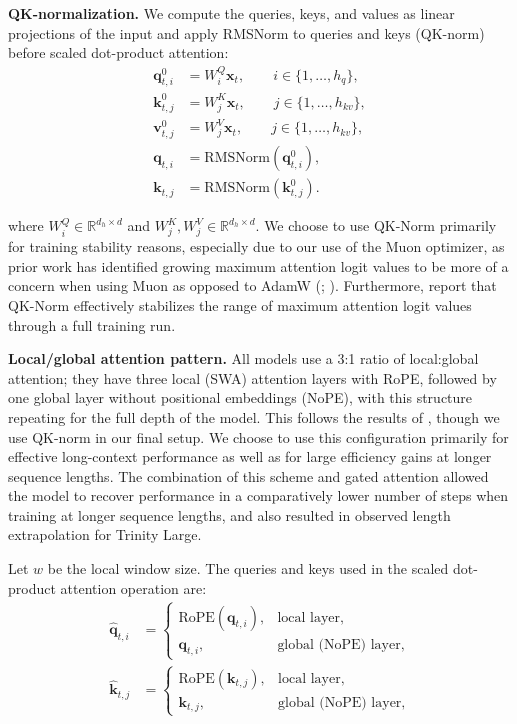 \documentclass{article}
\begin{document}
\vspace{0.25em}
\noindent\textbf{QK-normalization.}
We compute the queries, keys, and values as linear projections of the input and apply RMSNorm to queries and keys (QK-norm) before scaled dot-product attention:
\begin{align}
\mathbf{q}^{0}_{t,i} &= W^{Q}_{i}\mathbf{x}_t, \qquad i\in\{1,\dots,h_q\}, \tag{1}\\
\mathbf{k}^{0}_{t,j} &= W^{K}_{j}\mathbf{x}_t, \qquad j\in\{1,\dots,h_{kv}\}, \tag{2}\\
\mathbf{v}^{0}_{t,j} &= W^{V}_{j}\mathbf{x}_t, \qquad j\in\{1,\dots,h_{kv}\}, \tag{3}\\
\mathbf{q}_{t,i} &= \mathrm{RMSNorm}\!\left(\mathbf{q}^{0}_{t,i}\right), \tag{4}\\
\mathbf{k}_{t,j} &= \mathrm{RMSNorm}\!\left(\mathbf{k}^{0}_{t,j}\right). \tag{5}
\end{align}

where $W^Q_i\in\mathbb{R}^{d_h\times d}$ and $W^K_j,W^V_j\in\mathbb{R}^{d_h\times d}$. We choose to use QK-Norm primarily for training stability reasons, especially due to our use of the Muon optimizer, as prior work has identified growing maximum attention logit values to be more of a concern when using Muon as opposed to AdamW (\cite{liu2025muonscalablellmtraining}; \cite{kimiteam2025kimik2openagentic}). Furthermore, \cite{5team2025glm45agenticreasoningcoding} report that QK-Norm effectively stabilizes the range of maximum attention logit values through a full training run.

\vspace{0.25em}
\noindent\textbf{Local/global attention pattern.}
All models use a 3:1 ratio of local:global attention; they have three local (SWA) attention layers with RoPE, followed by one global layer without positional embeddings (NoPE), with this structure repeating for the full depth of the model. This follows the results of \cite{yang2025ropenopeagainnew}, though we use QK-norm in our final setup. We choose to use this configuration primarily for effective long-context performance as well as for large efficiency gains at longer sequence lengths. The combination of this scheme and gated attention allowed the model to recover performance in a comparatively lower number of steps when training at longer sequence lengths, and also resulted in observed length extrapolation for Trinity Large.

Let $w$ be the local window size. The queries and keys used in the scaled dot-product attention operation are:
\begin{align}
\widehat{\mathbf{q}}_{t,i} &=
\begin{cases}
\mathrm{RoPE}\!\left(\mathbf{q}_{t,i}\right), & \text{local layer},\\
\mathbf{q}_{t,i}, & \text{global (NoPE) layer},
\end{cases} \tag{6}\\
\widehat{\mathbf{k}}_{t,j} &=
\begin{cases}
\mathrm{RoPE}\!\left(\mathbf{k}_{t,j}\right), & \text{local layer},\\
\mathbf{k}_{t,j}, & \text{global (NoPE) layer},
\end{cases} \tag{7}
\end{align}
\end{document}
